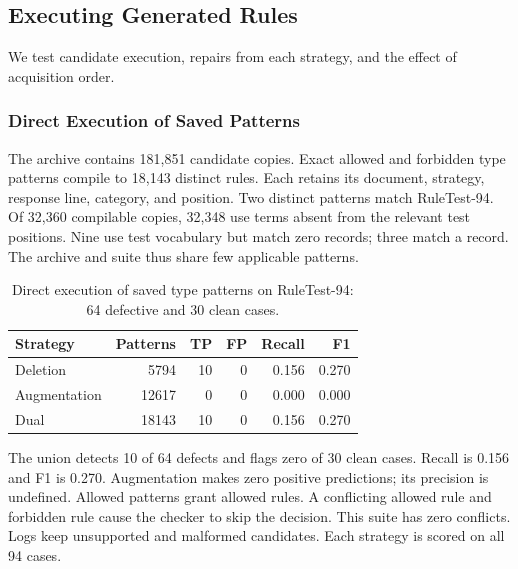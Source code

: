 \subsection{Executing Generated Rules}

\label{subsec:generated_rule_transfer}

We test candidate execution, repairs from each strategy, and the effect
of acquisition order.

\subsubsection{Direct Execution of Saved Patterns}

\label{sec:rule_execution_audit}

The archive contains 181,851 candidate copies. Exact allowed and forbidden
type patterns compile to 18,143 distinct rules. Each retains its document,
strategy, response line, category, and position. Two distinct patterns
match RuleTest-94. Of 32,360 compilable copies, 32,348 use terms absent
from the relevant test positions. Nine use test vocabulary but match
zero records; three match a record. The archive and suite thus share
few applicable patterns.

\begin{table}[t]
\centering
\caption{Direct execution of saved type patterns on RuleTest-94: 64 defective and 30 clean cases.}
\label{tab:direct_execution}
\footnotesize
\setlength{\tabcolsep}{3pt}
\begin{tabular*}{\columnwidth}{@{\extracolsep{\fill}}lrrrrr@{}}
\toprule
Strategy & Patterns & TP & FP & Recall & F1 \\
\midrule
Deletion & 5794 & 10 & 0 & 0.156 & 0.270 \\
Augmentation & 12617 & 0 & 0 & 0.000 & 0.000 \\
Dual & 18143 & 10 & 0 & 0.156 & 0.270 \\
\bottomrule
\end{tabular*}
\end{table}


The union detects 10 of 64 defects and flags zero of 30 clean cases.
Recall is 0.156 and F1 is 0.270. Augmentation makes zero positive
predictions; its precision is undefined. Allowed patterns grant allowed rules.
A conflicting allowed rule and forbidden rule cause the checker to skip
the decision. This suite has zero conflicts. Logs keep unsupported and
malformed candidates. Each strategy is scored on all 94 cases.

